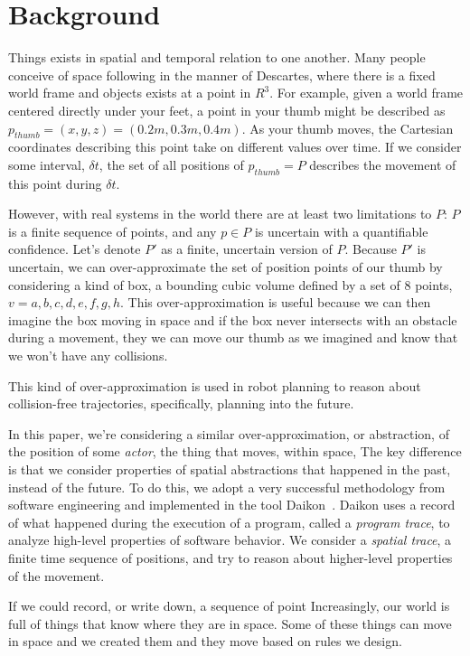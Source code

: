 \section{Background}
\label{sec:background}

Things exists in spatial and temporal relation to one another.
Many people conceive of space following in the manner of Descartes, where there is a fixed world frame and objects exists at a point in $R^3$.
For example, given a world frame centered directly under your feet, a point in your thumb might be described as $p_{thumb} = (x,y,z) = (0.2m, 0.3m, 0.4m)$.
As your thumb moves, the Cartesian coordinates describing this point take on different values over time.
If we consider some interval, $\delta t$, the set of all positions of $p_{thumb} = P$ describes the movement of this point during $\delta t$.

However, with real systems in the world there are at least two limitations to $P$: $P$ is a finite sequence of points, and any $p \in P$ is uncertain with a quantifiable confidence.
Let's denote $P'$ as a finite, uncertain version of $P$.
Because $P'$ is uncertain, we can over-approximate the set of position points of our thumb by considering a kind of box, a bounding cubic volume defined by a set of 8 points, $v = {a,b,c,d,e,f,g,h}$.
This over-approximation is useful because we can then imagine the box moving in space and if the box never intersects with an obstacle during a movement, they we can move our thumb as we imagined and know that we won't have any collisions.

This kind of over-approximation is used in robot planning to reason about collision-free trajectories, specifically, planning into the future.

In this paper, we're considering a similar over-approximation, or abstraction, of the position of some \emph{actor}, the thing that moves, within space, 
The key difference is that we consider properties of spatial abstractions that happened in the past, instead of the future.
To do this, we adopt a very successful methodology from software engineering and implemented in the tool Daikon~\cite{kataoka2001automated}.
Daikon uses a record of what happened during the execution of a program, called a \emph{program trace}, to analyze high-level properties of software behavior.
We consider a \emph{spatial trace}, a finite time sequence of positions, and try to reason about higher-level properties of the movement.

If we could record, or write down, a sequence of point 
Increasingly, our world is full of things that know where they are in space.
Some of these things can move in space and we created them and they move based on rules we design.

